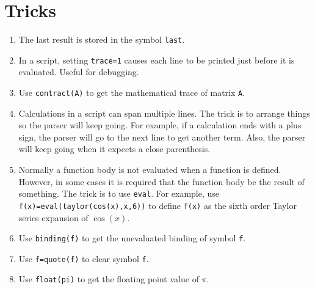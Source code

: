 
\section{Tricks}
\begin{enumerate}

\item
The last result is stored in the symbol {\tt last}.

\item
In a script, setting {\tt trace=1}
causes each line to be printed just before it is evaluated.
Useful for debugging.

\item
Use {\tt contract(A)} to get the mathematical trace of matrix \verb$A$.

\item
Calculations in a script can span multiple lines.
The trick is to arrange things so the parser will keep going.
For example, if a calculation ends with a plus sign, the parser will go to the next line to get another term.
Also, the parser will keep going when it expects a close parenthesis.

\item
Normally a function body is not evaluated when a function is defined.
However, in some cases it is required that the function body be the result of something.
The trick is to use \verb$eval$.
For example, use \verb$f(x)=eval(taylor(cos(x),x,6))$
to define \verb$f(x)$ as the sixth order Taylor series expansion of $\cos(x)$.

\item
Use \verb$binding(f)$ to get the unevaluated binding of symbol \verb$f$.

\item
Use \verb$f=quote(f)$ to clear symbol \verb$f$.

\item
Use \verb$float(pi)$ to get the floating point value of $\pi$.

\end{enumerate}
